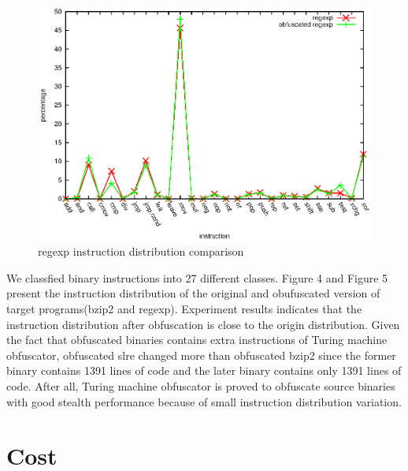 \documentclass[lnicst]{svmultln}
\begin{document}
\begin{figure}
  \includegraphics[width=0.9\linewidth]{st_regexp.eps}
  \caption{regexp instruction distribution comparison}
  \label{Figure 5}
\end{figure}
 We classfied binary instructions into 27 different classes. Figure 4 and Figure 5 present the instruction distribution of the original and obufuscated version of target programs(bzip2 and regexp). Experiment results indicates that the instruction distribution after obfuscation is close to the origin distribution. Given the fact that obfuscated binaries contains extra instructions of Turing machine obfuscator, obfuscated slre changed more than obfuscated bzip2 since the former binary contains 1391 lines of code and the later binary contains only 1391 lines of code. After all, Turing machine obfuscator is proved to obfuscate source binaries with good stealth performance because of small instruction distribution variation.

\section{Cost}
\end{document}
